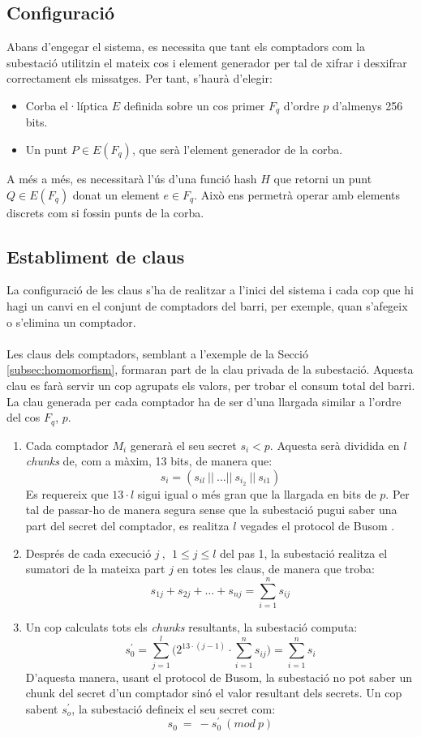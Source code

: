 \documentclass{article}
\begin{document}
\subsection{Configuració}
Abans d'engegar el sistema, es necessita que tant els comptadors com la subestació utilitzin el mateix cos i element generador per tal de xifrar i desxifrar correctament els missatges. Per tant, s'haurà d'elegir:
\begin{itemize}
	\item Corba el·líptica $E$ definida sobre un cos primer $F_q$ d'ordre $p$ d'almenys 256 bits.
	\item Un punt $P \in E(F_q)$, que serà l'element generador de la corba.
\end{itemize}
A més a més, es necessitarà l'ús d'una funció hash %
$H$ que retorni un punt $Q \in E(F_q)$ donat un element $e \in F_q$. Això ens permetrà operar amb elements discrets com si fossin punts de la corba. 
\subsection{Establiment de claus}\label{section:ks}
La configuració de les claus s'ha de realitzar a l'inici del sistema i cada cop que hi hagi un canvi en el conjunt de comptadors del barri, per exemple, quan s'afegeix o s'elimina un comptador.
\\
\\
Les claus dels comptadors, semblant a l'exemple de la Secció \ref{subsec:homomorfism}, formaran part de la clau privada de la subestació. Aquesta clau es farà servir un cop agrupats els valors, per trobar el consum total del barri.
La clau generada per cada comptador ha de ser d'una llargada similar a l'ordre del cos $F_q$, $p$.
\begin{enumerate}
	\item Cada comptador $M_i$ generarà el seu secret $s_i < p$. Aquesta serà dividida en $l$ \textit{chunks} de, com a màxim, 13 bits, de manera que:
	\[s_i = (s_{il}\ ||\ \dots ||\ s_{i_2}\ ||\ s_{i1})\]
	Es requereix que $13 \cdot l$ sigui igual o més gran que la llargada en bits de $p$. Per tal de passar-ho de manera segura sense que la subestació pugui saber una part del secret del comptador, es realitza  $l$ vegades el protocol de Busom \cite{busom}.
	\item Després de cada execució $j \ , \ \ 1 \le j \le l$ del pas 1, la subestació realitza el sumatori de la mateixa part $j$ en totes les claus, de manera que troba:
	\[s_{1j} + s_{2j} + \dots + s_{nj} = \sum_{i=1}^{n} s_{ij}\]
	\item Un cop calculats tots els \textit{chunks} resultants, la subestació computa:
	\[s_0^{'} = \sum_{j=1}^{l} \Big( 2^{13 \cdot (j - 1)} \cdot \sum_{i=1}^{n} s_{ij} \Big) = \sum_{i=1}^{n} s_i\]
	D'aquesta manera, usant el protocol de Busom, la subestació no pot saber un chunk del secret d'un comptador sinó el valor resultant dels secrets. Un cop sabent $s_o^{'}$, la subestació defineix el seu secret com:
	\[s_0\ =\ - s_0^{'} \ (mod \ p)\]
\end{enumerate}
\end{document}
